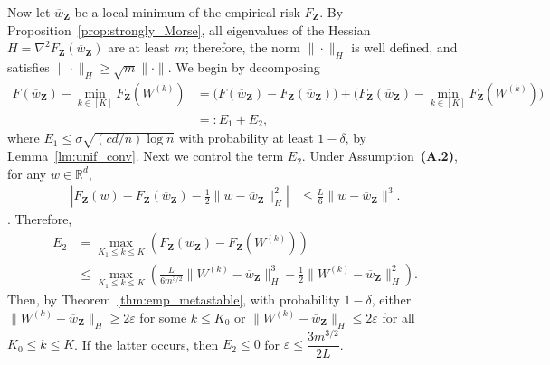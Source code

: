 \documentclass[final,12pt]{colt2018}
\numberwithin{equation}{section}
\numberwithin{equation}{section}
\def\Reals{\mathbb{R}}
\def\bd#1{\mathbf{#1}}
\def\bZ{\bd{Z}}
\def\barw{\overline{w}}
\def\eps{\varepsilon}
\begin{document}
Now let $\barw_\bZ$ be a local minimum of the empirical risk $F_\bZ$. By Proposition~\ref{prop:strongly_Morse}, all eigenvalues of the Hessian $H = \nabla^2 F_\bZ(\barw_\bZ)$ are at least $m$; therefore, the norm $\|\cdot\|_H$ is well defined, and satisfies $\|\cdot\|_H \ge \sqrt{m}\|\cdot\|$. We begin by decomposing
\begin{align*}
	F(\barw_\bZ) - \min_{k \in [K]} F_{\bZ}(W^{(k)}) &= \Big( F(\barw_\bZ) - F_{\bZ}(\barw_\bZ) \Big) + \Big( F_{\bZ}(\barw_\bZ) - \min_{k \in [K]} F_{\bZ}(W^{(k)}) \Big) \\
	&=: E_1 + E_2,
\end{align*}
where $E_1 \le \sigma\sqrt{(cd/n)\log n}$ with probability at least $1-\delta$, by Lemma~\ref{lm:unif_conv}. Next we control the term $E_2$. Under Assumption~{\bf(A.2)}, for any $w \in \Reals^d$,
	\begin{align*}
		\left|F_{\bZ}(w) - F_{\bZ}(\barw_\bZ)- \frac{1}{2} \| w - \barw_{\bZ} \|_H^2 \right| &\leq  \frac{L}{6} \| w - \barw_{\bZ} \|^3.
	\end{align*} 
\citep[Lemma~1.2.4]{nesterov2013introductory}. Therefore,
\begin{align*}
	E_2 &= \max_{K_1 \le k \le K} \left(F_\bZ(\barw_\bZ)-F_\bZ(W^{(k)})\right) \\
	&\le \max_{K_1 \le k \le K} \left(  \frac{L}{6m^{3/2}} \|W^{(k)}-\barw_\bZ\|^3_H  - \frac{1}{2}\|W^{(k)} - \barw_{\bZ} \|_H^2 \right).
\end{align*}
Then, by Theorem~\ref{thm:emp_metastable}, with probability $1-\delta$, either $\|W^{(k)}-\barw_\bZ\|_H \ge 2\eps$ for some $k \le K_0$ or $\|W^{(k)}-\barw_\bZ\|_H \le 2\eps$ for all $K_0 \le k \le K$. If the latter occurs, then $E_2 \le 0$ for $\eps \le \dfrac{3m^{3/2}}{2L}$.

\newpage





\newpage

\appendix

   
\end{document}
